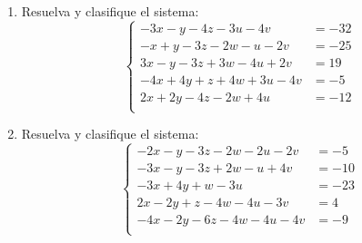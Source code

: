 \documentclass[11pt]{article}
\begin{document}
\begin{enumerate}
\[\begin{aligned}
-x-2z-w-u+4v&=12\\
4x-3y+w-4u-3v&=-4\\
\end{aligned}\right.
\]
\item Resuelva y clasifique el sistema:
\[
\left\{\begin{aligned}
-3x-y-4z-3u-4v&=-32\\
-x+y-3z-2w-u-2v&=-25\\
3x-y-3z+3w-4u+2v&=19\\
-4x+4y+z+4w+3u-4v&=-5\\
2x+2y-4z-2w+4u&=-12\\
\end{aligned}\right.
\]
\item Resuelva y clasifique el sistema:
\[
\left\{\begin{aligned}
-2x-y-3z-2w-2u-2v&=-5\\
-3x-y-3z+2w-u+4v&=-10\\
-3x+4y+w-3u&=-23\\
2x-2y+z-4w-4u-3v&=4\\
-4x-2y-6z-4w-4u-4v&=-9\\
\end{aligned}\right.
\]
\end{enumerate}
\end{document}
